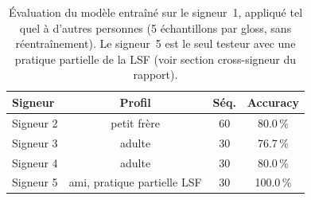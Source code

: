 \begin{table}[htbp]
    \centering
    \small
    \begin{tabular}{lccc}
        \toprule
        \textbf{Signeur} & \textbf{Profil} & \textbf{Séq.} & \textbf{Accuracy} \\
        \midrule
        Signeur 2 & petit frère & 60 & 80.0\,\% \\
        Signeur 3 & adulte & 30 & 76.7\,\% \\
        Signeur 4 & adulte & 30 & 80.0\,\% \\
        Signeur 5 & ami, pratique partielle LSF & 30 & 100.0\,\% \\
        \bottomrule
    \end{tabular}
    \caption[Cross-signeur sans réentraînement.]{Évaluation du modèle entraîné sur le signeur~1, appliqué tel quel à d'autres personnes (5 échantillons par gloss, sans réentraînement). Le signeur~5 est le seul testeur avec une pratique partielle de la LSF (voir section cross-signeur du rapport).}
    \label{tab:cross-signer}
\end{table}